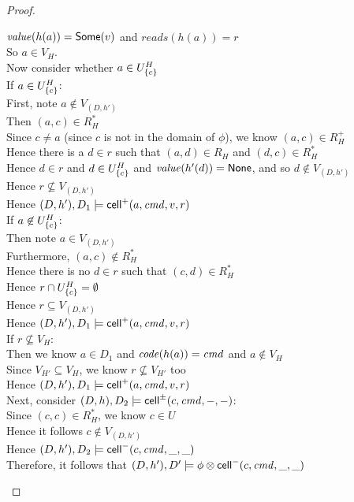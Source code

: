 \begin{proof}
\begin{tabbedproof}
       $\mathit{value}(h(a)) = \mathsf{Some}(v)$ and $\mathit{reads}(h(a)) = r$ \\
\ooooo So $a \in V_H$. \\
\ooooo Now consider whether $a \in U^H_{\{{c}\}}$ \\
\ooooo If $a \in U^H_{\{{c}\}}$: \\
\oooooo First, note $a \not\in V_{(D,h')}$ \\
\oooooo Then $(a, c) \in R^*_H$ \\
\oooooo Since $c \not= a$ (since $c$ is not in the domain of $\phi$), we know $(a, c) \in R^+_H$ \\
\oooooo Hence there is a $d \in r$ such that $(a,d) \in R_H$ and $(d, c) \in R^*_H$  \\
\oooooo Hence $d \in r$ and $d \in U^H_{\{{c}\}}$ and $\mathit{value}(h'(d)) = \mathsf{None}$, and so $d \not\in V_{(D,h')}$\\
\oooooo Hence $r \not\subseteq V_{(D, h')}$ \\
\oooooo Hence $(D,h'), D_1 \models \mathsf{cell}^{+}({a}, {\mathit{cmd}}, {v}, {r})$ \\
\ooooo If $a \not\in U^H_{\{{c}\}}$: \\
\oooooo Then note $a \in V_{(D,h')}$ \\
\oooooo Furthermore, $(a, c) \not\in R^*_H$ \\
\oooooo Hence there is no $d \in r$ such that $(c, d) \in R^*_H$  \\
\oooooo Hence $r \cap U^H_{\{{c}\}} = \emptyset$ \\
\oooooo Hence $r \subseteq V_{(D,h')}$ \\
\oooooo Hence $(D,h'), D_1 \models \mathsf{cell}^{+}({a}, {\mathit{cmd}}, {v}, {r})$ \\
\oooo If $r \not\subseteq V_H$: \\
\ooooo Then we know $a \in D_1$ and $\mathit{code}(h(a)) = \mathit{cmd}$ and $a \not\in V_H$  \\
\ooooo Since $V_{H'} \subseteq V_H$, we know $r \not\subseteq V_{H'}$ too \\
\ooooo Hence $(D,h'), D_1 \models \mathsf{cell}^{+}({a}, {\mathit{cmd}}, {v}, {r})$ \\
\oo Next, consider $(D,h), D_2 \models \mathsf{cell}^{\pm}({c}, {\mathit{cmd}}, {-}, {-})$: \\
\ooo Since $(c, c) \in R^*_H$,  we know $c \in U$ \\
\ooo Hence it follows $c \not\in V_{(D, h')}$ \\
\ooo Hence $(D,h'), D_2 \models \mathsf{cell}^{-}({c}, {\mathit{cmd}}, {\_}, {\_})$ \\
\oo Therefore, it follows that $(D,h'), D' \models \phi \otimes \mathsf{cell}^{-}({c}, {\mathit{cmd}}, {\_}, {\_})$ \\ 
\end{tabbedproof}
\end{proof}



